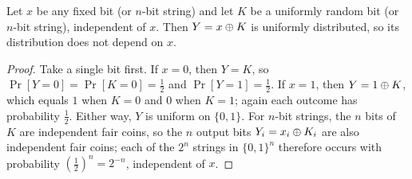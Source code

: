 \begin{lemma}
\label{ch09:masking}
Let $x$ be any fixed bit (or $n$-bit string) and let $K$ be a uniformly random bit (or $n$-bit string), independent of $x$. Then $Y = x \oplus K$ is uniformly distributed, so its distribution does not depend on $x$.
\end{lemma}

\begin{proof}
Take a single bit first. If $x = 0$, then $Y = K$, so $\Pr[Y=0] = \Pr[K=0] = \tfrac12$ and $\Pr[Y=1] = \tfrac12$. If $x = 1$, then $Y = 1 \oplus K$, which equals $1$ when $K=0$ and $0$ when $K=1$; again each outcome has probability $\tfrac12$. Either way, $Y$ is uniform on $\{0,1\}$. For $n$-bit strings, the $n$ bits of $K$ are independent fair coins, so the $n$ output bits $Y_i = x_i \oplus K_i$ are also independent fair coins; each of the $2^n$ strings in $\{0,1\}^n$ therefore occurs with probability $(\tfrac12)^n = 2^{-n}$, independent of $x$.
\end{proof}

